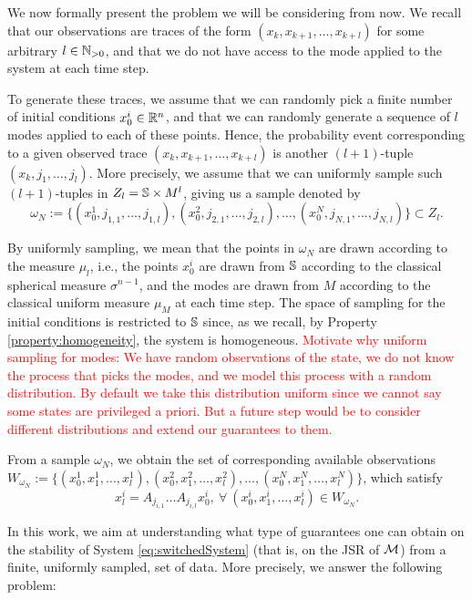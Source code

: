 We now formally present the problem we will be considering from now. We recall that our observations are traces of the form $(x_k,x_{k+1},\dots,x_{k+l})$ for some arbitrary $l \in \mathbb{N}_{>0}$, and that we do not have access to the mode applied to the system at each time step. 

To generate these traces, we assume that we can randomly pick a finite number of initial conditions $x_0^i \in \mathbb{R}^n$, and that we can randomly generate a sequence of $l$ modes applied to each of these points. Hence, the probability event corresponding to a given observed trace $(x_k,x_{k+1},\dots,x_{k+l})$ is another $(l+1)$-tuple $(x_k,j_1,\dots,j_l)$. More precisely, we assume that we can uniformly sample such $(l+1)$-tuples in $Z_l = \mathbb{S} \times M^l$, giving us a sample denoted by 
$$\omega_N := \{(x_0^1, j_{1,1}, \dots, j_{1,l}), (x_0^2, j_{2,1}, \dots, j_{2,l}), \ldots, (x_0^N, j_{N,1},\dots, j_{N,l})\} \subset Z_l.$$

By uniformly sampling, we mean that the points in $\omega_N$ are drawn according to the measure $\mu_l$, i.e., the points $x_0^i$ are drawn from $\mathbb{S}$ according to the classical spherical measure $\sigma^{n-1}$, and the modes are drawn from $M$ according to the classical uniform measure $\mu_M$ at each time step. The space of sampling for the initial conditions is restricted to $\mathbb{S}$ since, as we recall, by Property \ref{property:homogeneity}, the system is homogeneous. \textcolor{red}{Motivate why uniform sampling for modes: We have random observations of the state, we do not know the process that picks the modes, and we model this process with a random distribution. By default we take this distribution uniform since we cannot say some states are privileged a priori. But a future step would be to consider different distributions and extend our guarantees to them.}

From a sample $\omega_N$, we obtain the set of corresponding available observations $W_{\omega_N} := \{(x_0^1,x_1^1, \dots, x_l^1), (x_0^2,x_1^2, \dots, x_l^2), \ldots, (x_0^N,x_1^N, \dots, x_l^N)\}$, which satisfy $$x_l^i= A_{j_{i,1}} \dots A_{j_{i,l}} x_0^i, \ \forall\ (x_0^i,x_1^i,\dots, x_l^i) \in W_{\omega_N}.$$

In this work, we aim at understanding what type of guarantees one can obtain on the stability of System \eqref{eq:switchedSystem} (that is, on the JSR of $\mathcal{M}$) from a finite, uniformly sampled, set of data. More precisely, we answer the following problem:

